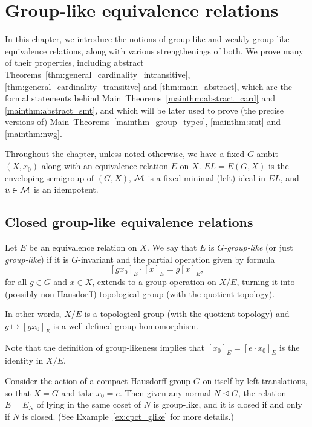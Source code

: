
	\chapter{Group-like equivalence relations}
	\label{chap:grouplike}
	In this chapter, we introduce the notions of group-like and weakly group-like equivalence relations, along with various strengthenings of both. We prove many of their properties, including abstract Theorems~\ref{thm:general_cardinality_intransitive}, \ref{thm:general_cardinality_transitive} and \ref{thm:main_abstract}, which are the formal statements behind Main~Theorems~\ref{mainthm:abstract_card} and \ref{mainthm:abstract_smt}, and which will be later used to prove (the precise versions of) Main~Theorems~\ref{mainthm_group_types}, \ref{mainthm:smt} and \ref{mainthm:nwg}.
	
	Throughout the chapter, unless noted otherwise, we have a fixed $G$-ambit $(X,x_0)$ along with an equivalence relation $E$ on $X$. $EL=E(G,X)$ is the enveloping semigroup of $(G,X)$, ${\mathcal M}$ is a fixed minimal (left) ideal in $EL$, and $u\in {\mathcal M}$ is an idempotent.
	
	\section{Closed group-like equivalence relations}
	\begin{dfn}
		\label{dfn:glike}
		Let $E$ be an equivalence relation on $X$. We say that $E$ is \emph{$G$-group-like} (or just \emph{group-like}) if it is $G$-invariant and the partial operation given by formula
		\[
		[gx_0]_E\cdot [x]_E=g[x]_E,
		\]
		for all $g\in G$ and $x\in X$, extends to a group operation on $X/E$, turning it into (possibly non-Hausdorff) topological group (with the quotient topology).
		
		In other words, $X/E$ is a topological group (with the quotient topology) and $g\mapsto [gx_0]_E$ is a well-defined group homomorphism.\xqed{\lozenge}
	\end{dfn}
	
	\begin{rem}
		Note that the definition of group-likeness implies that $[x_0]_E=[e\cdot x_0]_E$ is the identity in $X/E$.\xqed{\lozenge}
	\end{rem}
	
	\begin{ex}
		\label{ex:group_glike}
		Consider the action of a compact Hausdorff group $G$ on itself by left translations, so that $X=G$ and take $x_0=e$. Then given any normal $N\unlhd G$, the relation $E=E_N$ of lying in the same coset of $N$ is group-like, and it is closed if and only if $N$ is closed. (See Example~\ref{ex:cpct_glike} for more details.)\xqed{\lozenge}
	\end{ex}
	

